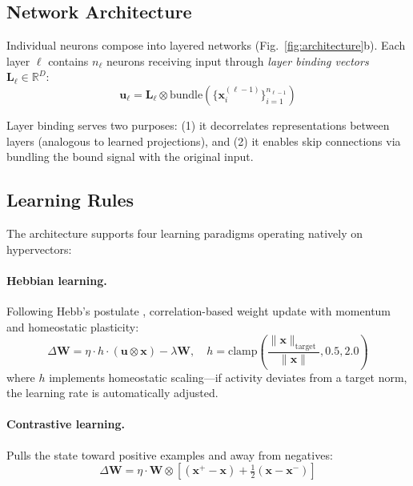 \documentclass{article}
\newcommand{\bind}{\otimes}
\newcommand{\R}{\mathbb{R}}
\newcommand{\hvx}{\mathbf{x}}
\newcommand{\hvw}{\mathbf{W}}
\newcommand{\hvinput}{\mathbf{u}}
\begin{document}
\subsection{Network Architecture}

Individual neurons compose into layered networks (Fig.~\ref{fig:architecture}b). Each layer $\ell$ contains $n_\ell$ neurons receiving input through \emph{layer binding vectors} $\mathbf{L}_\ell \in \R^D$:
\begin{equation}
    \hvinput_\ell = \mathbf{L}_\ell \bind \text{bundle}\!\left(\{\hvx_i^{(\ell-1)}\}_{i=1}^{n_{\ell-1}}\right)
\end{equation}

Layer binding serves two purposes: (1) it decorrelates representations between layers (analogous to learned projections), and (2) it enables skip connections via bundling the bound signal with the original input.

\subsection{Learning Rules}

The architecture supports four learning paradigms operating natively on hypervectors:

\paragraph{Hebbian learning.} Following Hebb's postulate \cite{hebb1949organization}, correlation-based weight update with momentum and homeostatic plasticity:
\begin{equation}
    \Delta \hvw = \eta \cdot h \cdot (\hvinput \bind \hvx) - \lambda \hvw, \quad h = \text{clamp}\!\left(\frac{\|\hvx\|_\text{target}}{\|\hvx\|}, 0.5, 2.0\right)
\end{equation}
where $h$ implements homeostatic scaling---if activity deviates from a target norm, the learning rate is automatically adjusted.

\paragraph{Contrastive learning.} Pulls the state toward positive examples and away from negatives:
\begin{equation}
    \Delta \hvw = \eta \cdot \hvw \bind \left[(\mathbf{x}^+ - \hvx) + \tfrac{1}{2}(\hvx - \mathbf{x}^-)\right]
\end{equation}
\end{document}

